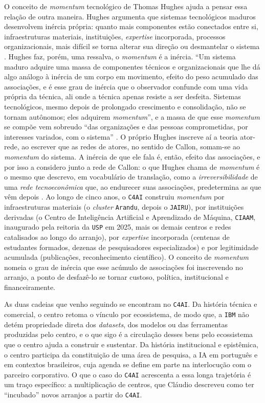 O conceito de \textit{momentum} tecnológico de Thomas Hughes ajuda a pensar essa relação de outra maneira. Hughes argumenta que sistemas tecnológicos maduros desenvolvem inércia própria: quanto mais componentes estão conectados entre si, infraestruturas materiais, instituições, \textit{expertise} incorporada, processos organizacionais, mais difícil se torna alterar sua direção ou desmantelar o sistema \parencite{Hughes1987Momentum}. Hughes faz, porém, uma ressalva, o \textit{momentum} é a inércia. \enquote{Um sistema maduro adquire uma massa de componentes técnicos e organizacionais que lhe dá algo análogo à inércia de um corpo em movimento, efeito do peso acumulado das associações, e é esse grau de inércia que o observador confunde com uma vida própria da técnica, ali onde a técnica apenas resiste a ser desfeita. Sistemas tecnológicos, mesmo depois de prolongado crescimento e consolidação, não se tornam autônomos; eles adquirem \textit{momentum}}, e a massa de que esse \textit{momentum} se compõe vem sobreudo \enquote{das organizações e das pessoas comprometidas, por interesses variados, com o sistema} \parencite[pp.~76--80, tradução livre]{Hughes1987Momentum}. O próprio Hughes inscreve aí a teoria ator-rede, ao escrever que as redes de atores, no sentido de Callon, somam-se ao \textit{momentum} do sistema. A inércia de que ele fala é, então, efeito das associações, e por isso a considero junto a rede de Callon: o que Hughes chama de \textit{momentum} é o mesmo que descrevo, em vocabulário de translação, como a \textit{irreversibilidade} de uma \textit{rede tecnoeconômica} que, ao endurecer suas associações, predetermina as que vêm depois \parencite{Callon1991Techno}. Ao longo de cinco anos, o \texttt{C4AI} construiu \textit{momentum} por infraestruturas materiais (o \textit{cluster} \texttt{Arandu}, depois o \texttt{JAIRU}), por instituições derivadas (o Centro de Inteligência Artificial e Aprendizado de Máquina, \texttt{CIAAM}, inaugurado pela reitoria da \texttt{USP} em 2025, mais os demais centros e redes catalisados ao longo do arranjo), por \textit{expertise} incorporada (centenas de estudantes formados, dezenas de pesquisadores especializados) e por legitimidade acumulada (publicações, reconhecimento científico). O conceito de \textit{momentum} nomeia o grau de inércia que esse acúmulo de associações foi inscrevendo no arranjo, a ponto de desfazê-lo se tornar custoso, política, institucional e financeiramente.

As duas cadeias que venho seguindo se encontram no \texttt{C4AI}. Da história técnica e comercial, o centro retoma o vínculo por ecossistema, de modo que, a \texttt{IBM} não detém propriedade direta dos \textit{datasets}, dos modelos ou das ferramentas produzidas pelo centro, e o que sigo é a circulação desses bens pelo ecossistema que o centro ajuda a construir e sustentar. Da história institucional e epistêmica, o centro participa da constituição de uma área de pesquisa, a IA em português e em contextos brasileiros, cuja agenda se define em parte na interlocução com o parceiro corporativo. O que o caso do \texttt{C4AI} acrescenta a essa longa trajetória é um traço específico: a multiplicação de centros, que Cláudio descreveu como ter \enquote{incubado} novos arranjos a partir do \texttt{C4AI}.

